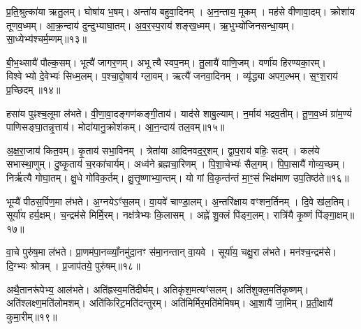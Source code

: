 प्र॒ति॒श्रुत्का॑या ऋतु॒लम्।
घोषा॑य भ॒षम्।
अन्ता॑य बहुवा॒दिनम्।
अ॒न॒न्ताय॒ मूकम्।
मह॑से वीणावा॒दम्।
क्रोशा॑य तूणव॒ध्मम्।
आ॒क्र॒न्दाय॑ दुन्दुभ्याघा॒तम्।
अ॒व॒र॒स्प॒राय॑ शङ्ख॒ध्मम्।
ऋ॒भुभ्यो॑जिनसन्धा॒यम्।
सा॒ध्येभ्य॑श्चर्म॒म्णम्॥१३॥

बी॒भ॒थ्सायै॑ पौल्क॒सम्।
भूत्यै॑ जागर॒णम्।
अभूत्यै स्वप॒नम्।
तु॒लायै॑ वाणि॒जम्।
वर्णा॑य हिरण्यका॒रम्।
विश्वेभ्यो दे॒वेभ्यः॑ सिध्म॒लम्।
प॒श्चा॒द्दो॒षाय॑ ग्ला॒वम्।
ऋत्यै॑ जनवा॒दिनम्।
व्यृ॑द्ध्या अपग॒ल्भम्।
स॒ꣳ॒श॒राय॑ प्र॒च्छिदम्॥१४॥

हसा॑य पुꣴश्च॒लूमा ल॑भते।
वी॒णा॒वा॒दङ्गण॑कङ्गी॒ताय॑।
याद॑से शाबु॒ल्याम्।
न॒र्माय॑ भद्रव॒तीम्।
तू॒ण॒व॒ध्मं ग्रा॑म॒ण्यं॑ पाणिसङ्घा॒तन्नृ॒त्ताय॑।
मोदा॑यानु॒क्रोश॑कम्।
आ॒न॒न्दाय॑ तल॒वम्॥१५॥

अ॒क्ष॒रा॒जाय॑ कित॒वम्।
कृ॒ताय॑ सभा॒विनम्।
त्रेता॑या आदिनवद॒र्॒शम्।
द्वा॒प॒राय॑ बहिः॒ सदम्।
कल॑ये सभास्था॒णुम्।
दु॒ष्कृ॒ताय॑ च॒रका॑चार्यम्।
अध्व॑ने ब्रह्मचा॒रिणम्।
पि॒शा॒चेभ्यः॑ सैल॒गम्।
पि॒पा॒सायै॑ गोव्य॒च्छम्।
निर्\mbox{}ऋ॑त्यै गोघा॒तम्।
क्षु॒धे गो॑विक॒र्तम्।
क्षु॒त्तृ॒ष्णाभ्या॒न्तम्।
यो गां वि॒कृन्त॑न्तं मा॒ꣳ॒सं भिक्ष॑माण उप॒तिष्ठ॑ते॥१६॥

भूम्यै॑ पीठस॒र्पिण॒मा ल॑भते।
अ॒ग्नये\-ऽꣳ॑स॒लम्।
वा॒यवे॑ चाण्डा॒लम्।
अ॒न्तरि॑क्षाय वꣳशन॒र्तिनम्।
दि॒वे ख॑ल॒तिम्।
सूर्या॑य हर्य॒क्षम्।
च॒न्द्रम॑से मिर्मि॒रम्।
नक्ष॑त्रेभ्यः कि॒लासम्।
अह्ने॑ शु॒क्लं पि॑ङ्ग॒लम्।
रात्रि॑यै कृ॒ष्णं पि॑ङ्गा॒क्षम्॥१७॥

वा॒चे पुरु॑ष॒मा ल॑भते।
प्रा॒णम॑पा॒नव्व्याँ॒नमु॑दा॒नꣳ स॑मा॒नन्तान् वा॒यवे।
सूर्या॑य॒ चक्षु॒रा ल॑भते।
मन॑श्च॒न्द्रम॑से।
दि॒ग्भ्यः श्रोत्रम्।
प्र॒जाप॑तये॒ पुरु॑षम्॥१८॥

अथै॒तानरू॑पेभ्य॒ आल॑भते।
अति॑ह्रस्व॒मति॑दीर्घम्।
अतिकृ॑श॒मत्यꣳ॑सलम्।
अति॑शुक्ल॒मति॑कृष्णम्।
अति॑श्लक्ष्ण॒\-मति॑लोमशम्।
अति॑किरिट॒मति॑दन्तुरम्।
अति॑मिर्मिर॒मति॑मेमिषम्।
आ॒शायै॑ जा॒मिम्।
प्र॒ती॒क्षायै॑ कुमा॒रीम्॥१९॥%




\clearpage
{}
\setcounter{anuvakam}{0}

